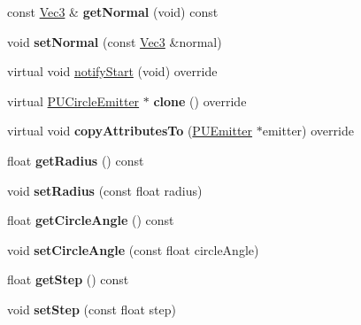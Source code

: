 \begin{DoxyCompactItemize}
const \hyperlink{classVec3}{Vec3} \& {\bfseries get\+Normal} (void) const
\item 
\mbox{\label{classPUCircleEmitter_a0260bbd85c1f76b88051b2cf0e641490}} 
void {\bfseries set\+Normal} (const \hyperlink{classVec3}{Vec3} \&normal)
\item 
virtual void \hyperlink{classPUCircleEmitter_aa714297bc24104e9f8461565c89da555}{notify\+Start} (void) override
\item 
\mbox{\label{classPUCircleEmitter_ad9cf0dc6ecfa2d2558e3dea4ed37a0ce}} 
virtual \hyperlink{classPUCircleEmitter}{P\+U\+Circle\+Emitter} $\ast$ {\bfseries clone} () override
\item 
\mbox{\label{classPUCircleEmitter_a65288feb0151e7cb495ef7d1059f7270}} 
virtual void {\bfseries copy\+Attributes\+To} (\hyperlink{classPUEmitter}{P\+U\+Emitter} $\ast$emitter) override
\item 
\mbox{\label{classPUCircleEmitter_ac01449343d92e4682159c2563619264c}} 
float {\bfseries get\+Radius} () const
\item 
\mbox{\label{classPUCircleEmitter_a9dc34ff83fa7ffceef2e092962d6e82f}} 
void {\bfseries set\+Radius} (const float radius)
\item 
\mbox{\label{classPUCircleEmitter_ac3e08c14d7e25b78c14fc47156e078fa}} 
float {\bfseries get\+Circle\+Angle} () const
\item 
\mbox{\label{classPUCircleEmitter_acf6d37ae14d9dfb0b3dae4f03eb2497a}} 
void {\bfseries set\+Circle\+Angle} (const float circle\+Angle)
\item 
\mbox{\label{classPUCircleEmitter_a556fdb6bbd3ae21e5b36d9631c686f74}} 
float {\bfseries get\+Step} () const
\item 
\mbox{\label{classPUCircleEmitter_a5dd53f8accbc80a9c9f094b9e9205044}} 
void {\bfseries set\+Step} (const float step)
\item 
\mbox{\label{classPUCircleEmitter_acb6b4094ea255b0302b026bfea62e12e}} 

\end{DoxyCompactItemize}
